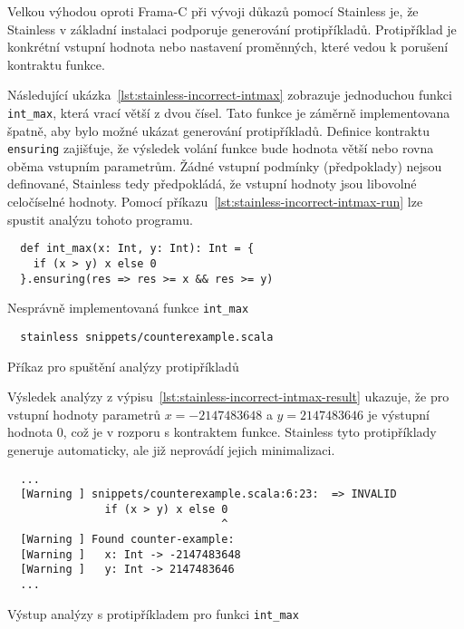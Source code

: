 Velkou výhodou oproti Frama\mbox{-}C při vývoji důkazů pomocí Stainless je,
že Stainless v základní instalaci podporuje generování protipříkladů.
Protipříklad je konkrétní vstupní hodnota nebo nastavení proměnných,
které vedou k porušení kontraktu funkce.

Následující ukázka~\ref{lst:stainless-incorrect-intmax} zobrazuje
jednoduchou funkci \texttt{int\_max}, která vrací větší z dvou čísel.
Tato funkce je záměrně implementovana špatně,
aby bylo možné ukázat generování protipříkladů.
Definice kontraktu \texttt{ensuring} zajišťuje,
že výsledek volání funkce bude hodnota větší nebo rovna oběma vstupním parametrům.
Žádné vstupní podmínky (předpoklady) nejsou definované,
Stainless tedy předpokládá, že vstupní hodnoty jsou libovolné celočíselné hodnoty.
Pomocí příkazu~\ref{lst:stainless-incorrect-intmax-run}
lze spustit analýzu tohoto programu.

\begin{listing}[H]
  \begin{verbatim}
  def int_max(x: Int, y: Int): Int = {
    if (x > y) x else 0
  }.ensuring(res => res >= x && res >= y)
  \end{verbatim}
  \caption{Nesprávně implementovaná funkce \texttt{int\_max}}
  \label{lst:stainless-incorrect-intmax}
\end{listing}

\begin{listing}[H]
  \begin{verbatim}
  stainless snippets/counterexample.scala
  \end{verbatim}
  \caption{Příkaz pro spuštění analýzy protipříkladů}
  \label{lst:stainless-incorrect-intmax-run}
\end{listing}

Výsledek analýzy z výpisu~\ref{lst:stainless-incorrect-intmax-result} ukazuje,
že pro vstupní hodnoty parametrů
$x = -2147483648$ a $y = 2147483646$
je výstupní hodnota $0$, což je v rozporu s kontraktem funkce.
Stainless tyto protipříklady generuje automaticky,
ale již neprovádí jejich minimalizaci.

\begin{listing}[H]
  \begin{verbatim}
  ...
  [Warning ] snippets/counterexample.scala:6:23:  => INVALID
               if (x > y) x else 0
                                 ^
  [Warning ] Found counter-example:
  [Warning ]   x: Int -> -2147483648
  [Warning ]   y: Int -> 2147483646
  ...
  \end{verbatim}
  \caption{Výstup analýzy s protipříkladem pro funkci \texttt{int\_max}}
  \label{lst:stainless-incorrect-intmax-result}
\end{listing}

